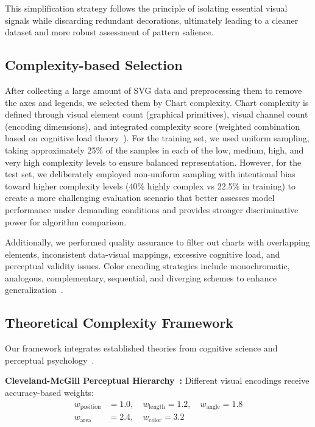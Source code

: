 \documentclass[journal]{IEEEtran}
\begin{document}
This simplification strategy follows the principle of isolating essential visual signals while discarding redundant decorations, ultimately leading to a cleaner dataset and more robust assessment of pattern salience.

\subsection{Complexity-based Selection}
After collecting a large amount of SVG data and preprocessing them to remove the axes and legends, we selected them by Chart complexity. Chart complexity is defined through visual element count (graphical primitives), visual channel count (encoding dimensions), and integrated complexity score (weighted combination based on cognitive load theory~\cite{cowan2001}). For the training set, we used uniform sampling, taking approximately 25\% of the samples in each of the low, medium, high, and very high complexity levels to ensure balanced representation. However, for the test set, we deliberately employed non-uniform sampling with intentional bias toward higher complexity levels (40\% highly complex vs 22.5\% in training) to create a more challenging evaluation scenario that better assesses model performance under demanding conditions and provides stronger discriminative power for algorithm comparison.

Additionally, we performed quality assurance to filter out charts with overlapping elements, inconsistent data-visual mappings, excessive cognitive load, and perceptual validity issues. Color encoding strategies include monochromatic, analogous, complementary, sequential, and diverging schemes to enhance generalization~\cite{bertin1967}.

\subsection{Theoretical Complexity Framework}
Our framework integrates established theories from cognitive science and perceptual psychology~\cite{cleveland1984,cowan2001,stevens1957}.

\textbf{Cleveland-McGill Perceptual Hierarchy~\cite{cleveland1984}:} Different visual encodings receive accuracy-based weights:
\begin{align}
w_{\text{position}} &= 1.0, \quad w_{\text{length}} = 1.2, \quad w_{\text{angle}} = 1.8 \nonumber \\
w_{\text{area}} &= 2.4, \quad w_{\text{color}} = 3.2
\end{align}
\end{document}
